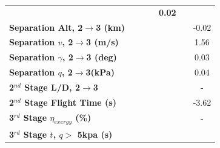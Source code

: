 \begin{table}[ht]
\begin{tabular}{l c c c c c c}
	& \textbf{\secondExergyEffqStandardNoReturn}
	& \textbf{\secondExergyEffqFiftyFiveNoReturn}
	& \textbf{\secondExergyEffqSixtyNoReturn}
	& \textbf{0.02}
	\\
	\textbf{Separation Alt, 2$\rightarrow$3 (km)}
	& \secondthirdSeparationAltqFortyNoReturn
	& \secondthirdSeparationAltqFortyFiveNoReturn
	& \secondthirdSeparationAltqStandardNoReturn
	& \secondthirdSeparationAltqFiftyFiveNoReturn
	& \secondthirdSeparationAltqSixtyNoReturn
	&-0.02
	\\
	\textbf{Separation $v$, 2$\rightarrow$3 (m/s)}
	& \secondthirdSeparationvqFortyNoReturn
	& \secondthirdSeparationvqFortyFiveNoReturn
	& \secondthirdSeparationvqStandardNoReturn
	& \secondthirdSeparationvqFiftyFiveNoReturn
	& \secondthirdSeparationvqSixtyNoReturn
	&1.56
	\\
	\textbf{Separation $\gamma$, 2$\rightarrow$3 (deg)}
	& \secondthirdSeparationgammaqFortyNoReturn
	& \secondthirdSeparationgammaqFortyFiveNoReturn
	& \secondthirdSeparationgammaqStandardNoReturn
	& \secondthirdSeparationgammaqFiftyFiveNoReturn
	& \secondthirdSeparationgammaqSixtyNoReturn
	&0.03
	\\
	\textbf{Separation $q$, 2$\rightarrow$3(kPa)}
	& \secondthirdSeparationqqFortyNoReturn
	& \secondthirdSeparationqqFortyFiveNoReturn
	& \secondthirdSeparationqqStandardNoReturn
	& \secondthirdSeparationqqFiftyFiveNoReturn
	& \secondthirdSeparationqqSixtyNoReturn
	&0.04
	\\
	\textbf{2$^{nd}$ Stage L/D, 2$\rightarrow$3}
	& \secondthirdSeparationLDqFortyNoReturn
	& \secondthirdSeparationLDqFortyFiveNoReturn
	& \secondthirdSeparationLDqStandardNoReturn
	& \secondthirdSeparationLDqFiftyFiveNoReturn
	& \secondthirdSeparationLDqSixtyNoReturn
	& -
	\\
	\textbf{2$^{nd}$ Stage Flight Time (s)}
	& \secondFlightTimeqFortyNoReturn
	& \secondFlightTimeqFortyFiveNoReturn
	& \secondFlightTimeqStandardNoReturn
	& \secondFlightTimeqFiftyFiveNoReturn
	& \secondFlightTimeqSixtyNoReturn
	&-3.62
	\\
	\hline 
	\textbf{3$^{rd}$ Stage $\eta_{exergy}$ (\%)}
	& \textbf{\thirddExergyEffqFortyNoReturn}
	& \textbf{\thirddExergyEffqFortyFiveNoReturn}
	& \textbf{\thirddExergyEffqStandardNoReturn}
	& \textbf{\thirddExergyEffqFiftyFiveNoReturn}
	& \textbf{\thirddExergyEffqSixtyNoReturn}
	& -
	\\
	\textbf{3$^{rd}$ Stage $t$, $q >$ 5kpa (s)}
	& \thirdqOverFiveqFortyNoReturn
	& \thirdqOverFiveqFortyFiveNoReturn
	& \thirdqOverFiveqStandardNoReturn
	& \thirdqOverFiveqFiftyFiveNoReturn

\end{tabular}
\end{table}
